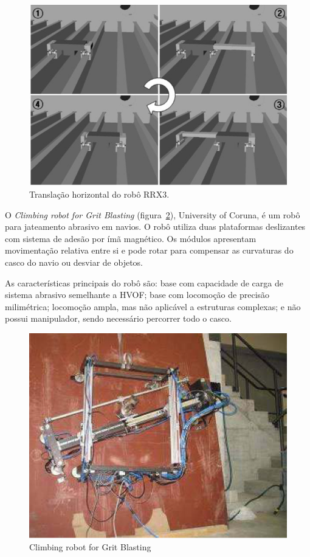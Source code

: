 \begin{figure}[ht]
\centering
\includegraphics[width=\columnwidth]{sota/figs/climbers/RRX3_moving.jpg}
\caption{Translação horizontal do robô RRX3.}
\label{rrx3}
\end{figure}

O \emph{Climbing robot for Grit Blasting} (figura~\ref{grit}), University of
Coruna, é um robô para jateamento abrasivo em navios. O robô utiliza duas plataformas deslizantes com sistema de adesão por
ímã magnético. Os módulos apresentam movimentação relativa entre si e pode rotar
para compensar as curvaturas do casco do navio ou desviar de objetos. 

As características principais do robô são: base com
capacidade de carga de sistema abrasivo semelhante a HVOF; base com
locomoção de precisão milimétrica; locomoção ampla, mas não aplicável a
estruturas complexas; e não possui manipulador, sendo necessário percorrer todo
o casco.

\begin{figure}[ht]
\centering
\includegraphics[width=\columnwidth]{sota/figs/climbers/grit.png}
\caption{Climbing robot for Grit Blasting}
\label{grit}
\end{figure}

